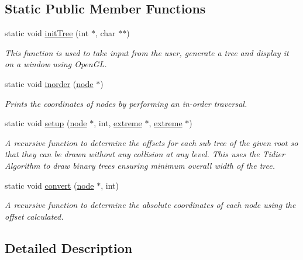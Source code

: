 \subsection*{Static Public Member Functions}
\begin{DoxyCompactItemize}
\item 
static void \mbox{\hyperlink{class_tree_a10a93c33011969ce54b35524165c3a2a}{init\+Tree}} (int $\ast$, char $\ast$$\ast$)
\begin{DoxyCompactList}\small\item\em This function is used to take input from the user, generate a tree and display it on a window using Open\+GL. \end{DoxyCompactList}\item 
static void \mbox{\hyperlink{class_tree_ae7b4d81b53bd06b5556d46b64b4558f5}{inorder}} (\mbox{\hyperlink{structnode}{node}} $\ast$)
\begin{DoxyCompactList}\small\item\em Prints the coordinates of nodes by performing an in-\/order traversal. \end{DoxyCompactList}\item 
static void \mbox{\hyperlink{class_tree_af4cacacfa6f38926ecbf22722cb33cc3}{setup}} (\mbox{\hyperlink{structnode}{node}} $\ast$, int, \mbox{\hyperlink{structextreme}{extreme}} $\ast$, \mbox{\hyperlink{structextreme}{extreme}} $\ast$)
\begin{DoxyCompactList}\small\item\em A recursive function to determine the offsets for each sub tree of the given root so that they can be drawn without any collision at any level. This uses the Tidier Algorithm to draw binary trees ensuring minimum overall width of the tree. \end{DoxyCompactList}\item 
static void \mbox{\hyperlink{class_tree_a139d5988d1628db018c77c3c1be4d100}{convert}} (\mbox{\hyperlink{structnode}{node}} $\ast$, int)
\begin{DoxyCompactList}\small\item\em A recursive function to determine the absolute coordinates of each node using the offset calculated. \end{DoxyCompactList}\end{DoxyCompactItemize}


\subsection{Detailed Description}


